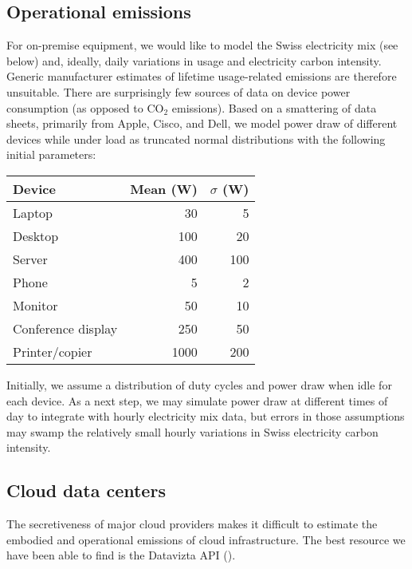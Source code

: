 \documentclass[11pt]{article}
\begin{document}
\subsection{Operational emissions}

For on-premise equipment, we would like to model the Swiss electricity mix (see below) and, ideally,
daily variations in usage and electricity carbon intensity.
Generic manufacturer estimates of lifetime usage-related emissions are therefore unsuitable.
There are surprisingly few sources of data on device power consumption (as opposed to CO$_2$ emissions).
Based on a smattering of data sheets, primarily from Apple, Cisco, and Dell, we model
power draw of different devices while under load as truncated normal distributions with the
following initial parameters:

\begin{center}
\begin{tabular}{|l|r|r|}
\hline
\textbf{Device} & \textbf{Mean (W)} & \textbf{$\sigma$ (W)} \\ \hline
Laptop & 30 & 5 \\ \hline
Desktop & 100 & 20 \\ \hline
Server & 400 & 100 \\ \hline
Phone & 5 & 2 \\ \hline
Monitor & 50 & 10 \\ \hline
Conference display & 250 & 50 \\ \hline
Printer/copier & 1000 & 200 \\ \hline
\end{tabular}
\end{center}

Initially, we assume a distribution of duty cycles and power draw when idle for each device.
As a next step, we may simulate power draw at different times of day to integrate with
hourly electricity mix data, but errors in those assumptions may swamp the relatively small
hourly variations in Swiss electricity carbon intensity.

\subsection{Cloud data centers}
\label{sec:cloud_data_centers}

The secretiveness of major cloud providers makes it difficult to estimate the embodied and operational emissions of cloud
infrastructure. The best resource we have been able to find is the Datavizta API (\textcite{boavizta}).
\end{document}

